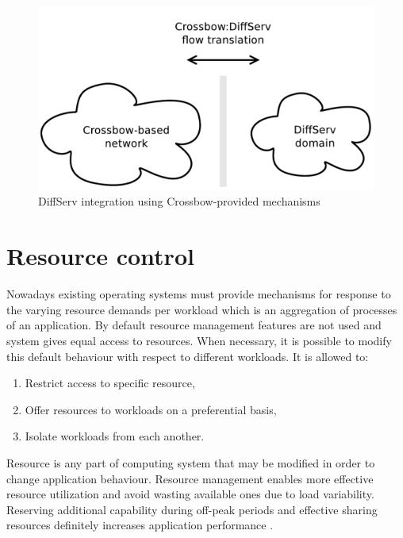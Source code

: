 \documentclass[11pt,openany]{book}
\begin{document}
        \begin{figure}[H]
          \begin{center}
            \includegraphics[width=.7\textwidth]{img/solaris/xbow-diffserv.pdf}
          \end{center}

          \caption{DiffServ integration using Crossbow-provided mechanisms}
        \end{figure}


    \section{Resource control}
    \label{sec:sol:res}

      Nowadays existing operating systems must provide mechanisms for response to the varying resource demands per
      workload which is an aggregation of processes of an application. By default resource management features are not
      used and system gives equal access to resources. When necessary, it is possible to modify this default behaviour
      with respect to different workloads. It is allowed to:

      \begin{enumerate}
        \item Restrict access to specific resource,
        \item Offer resources to workloads on a preferential basis,
        \item Isolate workloads from each another.
      \end{enumerate}
	
      Resource is any part of computing system that may be modified in order to change application behaviour. Resource
      management enables more effective resource utilization and avoid wasting available ones due to load variability.
      Reserving additional capability during off-peak periods and effective sharing resources definitely increases
      application performance \cite{oracle_admin_guide}.
\end{document}
